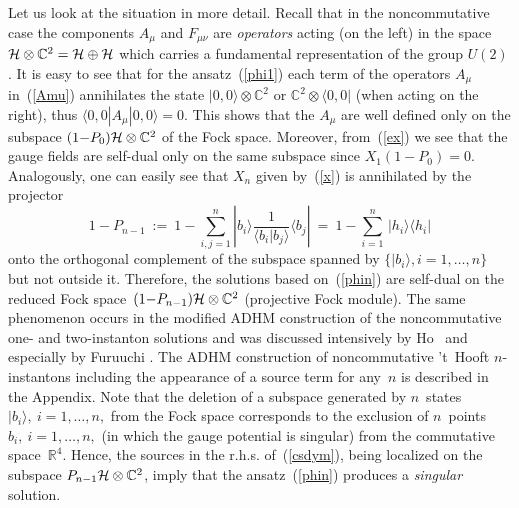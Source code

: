 \documentclass[a4paper,11pt]{article}
\numberwithin{equation}{section}
\newcommand{\C}{\mathbb C}
\newcommand{\R}{\mathbb R}
\newcommand{\Hcal}{{\cal H}}
\def\>{\rangle}
\def\<{\langle}
\begin{document}
{Let us look at the situation in more detail.
Recall that  in the noncommutative case the
components $A_\mu$ and $F_{\mu\nu}$ are {\it operators\/} acting 
(on the left) in the space $\Hcal\otimes\C^2 = \Hcal\oplus\Hcal$ 
which carries a fundamental representation of the group $U(2)$. 
It is easy to see that for the ansatz~(\ref{phi1}) each
term of the operators $A_\mu$ in~(\ref{Amu}) 
annihilates the state $|0,0\>\otimes\C^2$ or $\C^2\otimes\<0,0|$ 
(when acting on the right), thus $\<0,0|A_\mu |0,0\>=0$. 
This shows that the $A_\mu$ are well defined only on the subspace
$(1{-}P_0)\Hcal\otimes \C^2$ of the Fock space.
Moreover, from~(\ref{ex}) we see that the gauge fields are self-dual
only on the same subspace since $X_1(1{-}P_0)=0$. 
Analogously, one can easily see that $X_n$ given by~(\ref{x})
is annihilated by the projector
\begin{equation}
1-P_{n-1}\ :=\ 1-\sum_{i,j=1}^n|b_i\>\frac{1}{\<b_i|b_j\>}\<b_j|
\ =\ 1-\sum_{i=1}^n\,|h_i\>\<h_i|
\end{equation}
onto the orthogonal complement of the subspace spanned by $\{|b_i\>, 
i=1,\ldots,n\}$ but not outside it. Therefore, the solutions based 
on~(\ref{phin}) are self-dual on the reduced Fock 
space~$(1{-}P_{n-1})\Hcal\otimes\C^2$ (projective Fock module).
The same phenomenon occurs in the modified ADHM construction 
of the noncommutative one- and two-instanton solutions and was 
discussed intensively by Ho~\cite{Ho:2000ea} and especially by Furuuchi
\cite{Furuuchi:2000kv,Furuuchi:2001vx,Furuuchi:2001dx,Furuuchi:2000vc}. 
The ADHM construction of noncommutative 't~Hooft $n$-instantons including 
the appearance of a source term for any~$n$ is described in the Appendix.
Note that the deletion of a subspace generated by $n$~states 
$|b_i\>,\ i=1,\ldots,n,$ from the Fock space corresponds to the exclusion 
of $n$~points $b_i,\ i=1,\ldots,n,$ (in which the gauge potential 
is singular) from the commutative space~$\R^4$.
Hence, the sources in the r.h.s. of~(\ref{csdym}), being localized on the
subspace $P_{n-1}\Hcal\otimes\C^2$,
imply that the ansatz~(\ref{phin}) produces a {\it singular\/} solution.

}
\end{document}
